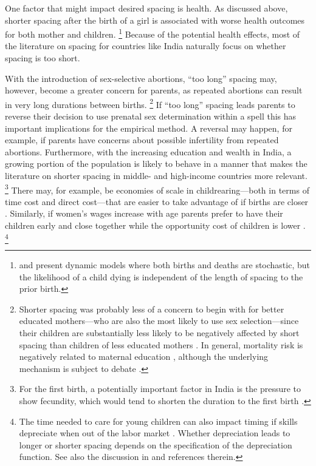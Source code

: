 \documentclass[12pt,letterpaper]{article}
\begin{document}
One factor that might impact desired spacing is health.
As discussed above, shorter spacing after the birth of a girl is 
associated with worse health outcomes for both mother and children.%
\footnote{
\citet{wolpin84} and \citet{Newman1988} present dynamic models 
where both births and deaths are stochastic, but the likelihood of
a child dying is independent of the length of spacing to
the prior birth.
}
Because of the potential health effects, most of the literature on spacing 
for countries like India naturally focus on whether spacing is too short.

With the introduction of sex-selective abortions, ``too long'' spacing 
may, however, become a greater concern for parents, as 
repeated abortions can result in very long durations between births.%
\footnote{
Shorter spacing was probably less of a concern to begin with for
better educated mothers---who are also the most likely to use 
sex selection---since their children are substantially less likely 
to be negatively affected by short spacing than children of less 
educated mothers \citep{Whitworth2002}.
In general, mortality risk is negatively related to maternal
education \citep[for India, see, for example,][]{Tulasidhar1993},
although the underlying mechanism is subject
to debate \citep{Kovsted2002}.
}
If ``too long'' spacing leads parents to reverse their decision to use
prenatal sex determination within a spell this has important implications 
for the empirical method.
A reversal may happen, for example, if parents have concerns about possible 
infertility from repeated abortions.
Furthermore, with the increasing education and wealth in India, a growing 
portion of the population is likely to behave in a manner that makes the 
literature on shorter spacing in middle- and high-income countries more relevant.%
\footnote{
For the first birth, a potentially important factor in India is 
the pressure to show fecundity, which would tend to shorten
the duration to the first birth \citep{dyson83,Sethuraman2007,Dommaraju2009}.
}
There may, for example, be economies of scale in childrearing---both
in terms of time cost and direct cost---that are easier to
take advantage of if births are closer \citep[p 947]{Newman1984}.
Similarly, if women's wages increase with age parents prefer
to have their children early and close together while 
the opportunity cost of children is lower \citep{Heckman1976}.%
\footnote{
The time needed to care for young children can also impact 
timing if skills depreciate when out of the labor market \citep{Happel1984}.
Whether depreciation leads to longer or shorter spacing depends
on the specification of the depreciation function.
See also the discussion in \citet[p 315]{Hotz1997}
and references therein.
}
\end{document}
